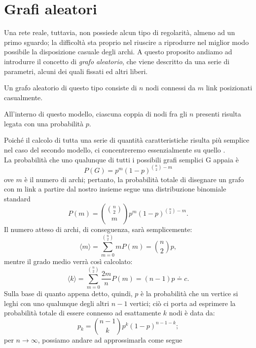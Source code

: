 \section{Grafi aleatori}
Una rete reale, tuttavia, non possiede alcun tipo di regolarità, almeno ad un primo sguardo; la difficoltà sta proprio nel riuscire a riprodurre nel miglior modo possibile la disposizione casuale degli archi. A questo proposito andiamo ad introdurre il concetto di \emph{grafo aleatorio}, che viene descritto da una serie di parametri, alcuni dei quali fissati ed altri liberi.
\begin{definizione}
Un grafo aleatorio di questo tipo consiste di $ n $ nodi connessi da $ m $ link posizionati casualmente.
\end{definizione}
\begin{definizione}
All'interno di questo modello, ciascuna coppia di nodi fra gli $ n $ presenti risulta legata con una probabilità $ p $.
\end{definizione}
%
Poiché il calcolo di tutta una serie di quantità caratteristiche risulta più semplice nel caso del secondo modello, ci concentreremo essenzialmente su quello \cite{Barabasi}. \\
La probabilità che uno qualunque di tutti i possibili grafi semplici G appaia è
\begin{equation}
P \left(G \right) = p^m \left( 1 - p \right)^{\binom{n}{2} - m}
\end{equation}
ove $ m $ è il numero di archi; pertanto, la probabilità totale di disegnare un grafo con m link a partire dal nostro insieme segue una distribuzione binomiale standard
\begin{equation}
P \left(m \right) = \binom{\binom{n}{2}}{m} p^m \left( 1 - p \right)^{\binom{n}{2} - m}.
\end{equation}
Il numero atteso di archi, di conseguenza, sarà semplicemente:
\begin{equation}
\langle m \rangle = \sum_{m=0}^{\binom{n}{2}} m P \left(m \right) = \binom{n}{2} p,
\end{equation}
mentre il grado medio verrà così calcolato:
\begin{equation}
\langle k \rangle = \sum_{m=0}^{{\binom{n}{2}}} \frac{2m}{n} P \left(m \right) = \left( n - 1 \right) p \doteq c.
\end{equation}
%
Sulla base di quanto appena detto, quindi, $ p $ è la probabilità che un vertice si leghi con uno qualunque degli altri $ n - 1 $ vertici; ciò ci porta ad esprimere la probabilità totale di essere connesso ad esattamente $ k $ nodi è data da:
\begin{equation}
p_k = \binom{n - 1}{k} p^k \left(1 - p \right)^{n - 1 - k};
\end{equation} 
per $ n \rightarrow \infty $, possiamo andare ad approssimarla come segue

